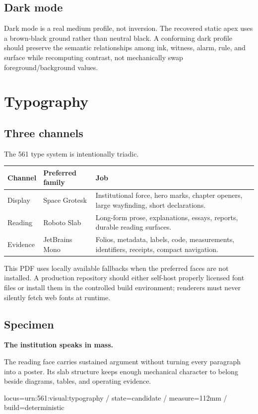 \documentclass[11pt,twoside,openany]{report}
\begin{document}
\section{Dark mode}
Dark mode is a real medium profile, not inversion. The recovered static apex uses a brown-black ground rather than neutral black. A conforming dark profile should preserve the semantic relationships among ink, witness, alarm, rule, and surface while recomputing contrast, not mechanically swap foreground/background values.

\clearpage
\chapter{Typography}

\section{Three channels}
The 561 type system is intentionally triadic.

\begin{tabularx}{\textwidth}{@{}L{30mm}L{42mm}Y@{}}
\toprule
Channel & Preferred family & Job\\
\midrule
Display & Space Grotesk & Institutional force, hero marks, chapter openers, large wayfinding, short declarations.\\
Reading & Roboto Slab & Long-form prose, explanations, essays, reports, durable reading surfaces.\\
Evidence & JetBrains Mono & Folios, metadata, labels, code, measurements, identifiers, receipts, compact navigation.\\
\bottomrule
\end{tabularx}

This PDF uses locally available fallbacks when the preferred faces are not installed. A production repository should either self-host properly licensed font files or install them in the controlled build environment; renderers must never silently fetch web fonts at runtime.

\section{Specimen}
{\FSODisplay\bfseries\fontsize{30}{32}\selectfont The institution speaks in mass.}\par
\vspace{7pt}
{\FSOReading\fontsize{12}{17}\selectfont The reading face carries sustained argument without turning every paragraph into a poster. Its slab structure keeps enough mechanical character to belong beside diagrams, tables, and operating evidence.}\par
\vspace{7pt}
{\FSOEvidence\fontsize{8}{10.5}\selectfont locus=urn:561:visual:typography / state=candidate / measure=112mm / build=deterministic}\par
\end{document}
